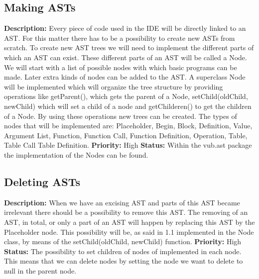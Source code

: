 \documentclass[a4paper,12pt]{report}
\begin{document}
\subsection{Making ASTs}
\textbf{Description: } Every piece of code used in the IDE will be directly linked to an AST. For this matter there has to be a possibility to create new ASTs from scratch.
To create new AST trees we will need to implement the different parts of which an AST can exist. These different parts of an AST will be called a Node. We will start with
a list of possible nodes with which basic programs can be made. Later extra kinds of nodes can be added to the AST.
A superclass Node will be implemented which will organize the tree structure by providing operations like getParent(), which gets the parent of a Node, setChild(oldChild, newChild)
which will set a child of a node and getChilderen() to get the children of a Node. By using these operations new trees can be created. 
The types of nodes that will be implemented are: Placeholder, Begin, Block, Definition, Value, Argument List, Function, Function Call, Function Definition, Operation, Table, Table Call
Table Definition.
 \newline
\textbf{Priority:} High \newline
\textbf{Status: }  Within the vub.ast package the implementation of the Nodes can be found.   \newline
\subsection{Deleting ASTs}
\textbf{Description: }When we have an excising AST and parts of this AST became irrelevant there should be a possibility to remove this AST. The removing of an AST, in total,
or only a part of an AST will happen by replacing this AST by the Placeholder node. This possibility will be, as said in 1.1 implemented in the Node class, by means of the 
setChild(oldChild, newChild) function. \newline
\textbf{Priority:} High \newline
\textbf{Status: } The possibility to set children of nodes of implemented in each node. This means that we can delete nodes by setting the 
node we want to delete to null in the parent node.\newline
\end{document}
